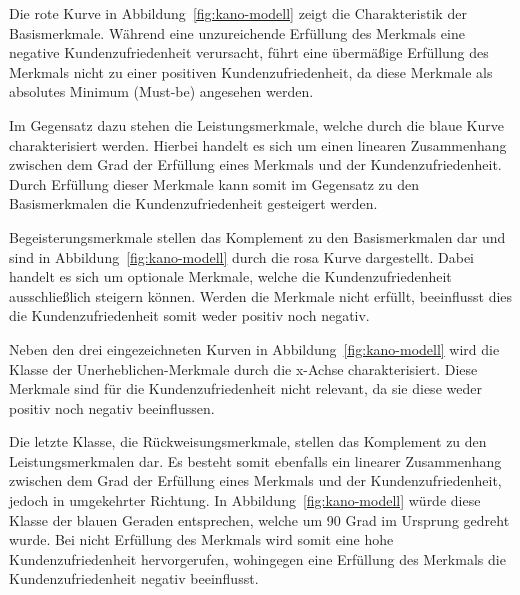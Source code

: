 Die rote Kurve in Abbildung~\ref{fig:kano-modell} zeigt die Charakteristik der Basismerkmale.
Während eine unzureichende Erfüllung des Merkmals eine negative Kundenzufriedenheit verursacht, führt eine übermäßige Erfüllung des Merkmals nicht zu einer positiven Kundenzufriedenheit, da diese Merkmale als absolutes Minimum (Must-be) angesehen werden.

Im Gegensatz dazu stehen die Leistungsmerkmale, welche durch die blaue Kurve charakterisiert werden.
Hierbei handelt es sich um einen linearen Zusammenhang zwischen dem Grad der Erfüllung eines Merkmals und der Kundenzufriedenheit.
Durch Erfüllung dieser Merkmale kann somit im Gegensatz zu den Basismerkmalen die Kundenzufriedenheit gesteigert werden.

Begeisterungsmerkmale stellen das Komplement zu den Basismerkmalen dar und sind in Abbildung~\ref{fig:kano-modell} durch die rosa Kurve dargestellt.
Dabei handelt es sich um optionale Merkmale, welche die Kundenzufriedenheit ausschließlich steigern können.
Werden die Merkmale nicht erfüllt, beeinflusst dies die Kundenzufriedenheit somit weder positiv noch negativ.

Neben den drei eingezeichneten Kurven in Abbildung~\ref{fig:kano-modell} wird die Klasse der Unerheblichen-Merkmale durch die x-Achse charakterisiert.
Diese Merkmale sind für die Kundenzufriedenheit nicht relevant, da sie diese weder positiv noch negativ beeinflussen.

Die letzte Klasse, die Rückweisungsmerkmale, stellen das Komplement zu den Leistungsmerkmalen dar.
Es besteht somit ebenfalls ein linearer Zusammenhang zwischen dem Grad der Erfüllung eines Merkmals und der Kundenzufriedenheit, jedoch in umgekehrter Richtung.
In Abbildung~\ref{fig:kano-modell} würde diese Klasse der blauen Geraden entsprechen, welche um 90 Grad im Ursprung gedreht wurde.
Bei nicht Erfüllung des Merkmals wird somit eine hohe Kundenzufriedenheit hervorgerufen, wohingegen eine Erfüllung des Merkmals die Kundenzufriedenheit negativ beeinflusst.
\newline


